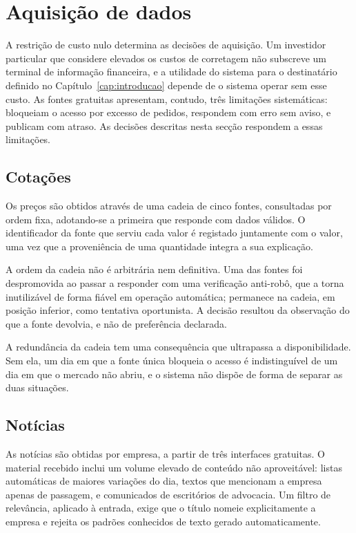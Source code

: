 \section{Aquisição de dados}
\label{sec:sis_dados}

A restrição de custo nulo determina as decisões de aquisição. Um investidor particular que
considere elevados os custos de corretagem não subscreve um terminal de informação financeira, e a
utilidade do sistema para o destinatário definido no Capítulo~\ref{cap:introducao} depende de o
sistema operar sem esse custo. As fontes gratuitas apresentam, contudo, três limitações
sistemáticas: bloqueiam o acesso por excesso de pedidos, respondem com erro sem aviso, e publicam
com atraso. As decisões descritas nesta secção respondem a essas limitações.

\subsection{Cotações}

Os preços são obtidos através de uma cadeia de cinco fontes, consultadas por ordem fixa,
adotando-se a primeira que responde com dados válidos. O identificador da fonte que serviu cada
valor é registado juntamente com o valor, uma vez que a proveniência de uma quantidade integra a
sua explicação.

A ordem da cadeia não é arbitrária nem definitiva. Uma das fontes foi despromovida ao passar a
responder com uma verificação anti-robô, que a torna inutilizável de forma fiável em operação
automática; permanece na cadeia, em posição inferior, como tentativa oportunista. A decisão
resultou da observação do que a fonte devolvia, e não de preferência declarada.

A redundância da cadeia tem uma consequência que ultrapassa a disponibilidade. Sem ela, um dia em
que a fonte única bloqueia o acesso é indistinguível de um dia em que o mercado não abriu, e o
sistema não dispõe de forma de separar as duas situações.

\subsection{Notícias}
\label{sec:sis_fontes}

As notícias são obtidas por empresa, a partir de três interfaces gratuitas. O material recebido
inclui um volume elevado de conteúdo não aproveitável: listas automáticas de maiores variações do
dia, textos que mencionam a empresa apenas de passagem, e comunicados de escritórios de advocacia.
Um filtro de relevância, aplicado à entrada, exige que o título nomeie explicitamente a empresa e
rejeita os padrões conhecidos de texto gerado automaticamente.

